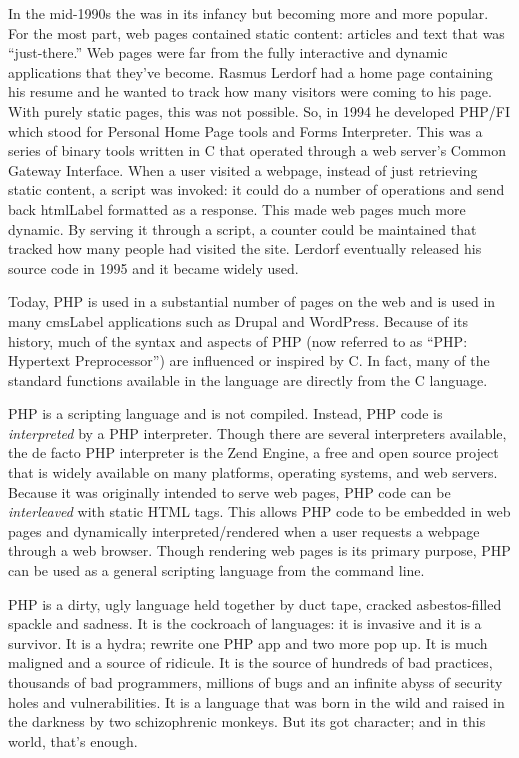 

In the mid-1990s the 
was in its infancy but
becoming more and more popular.  For the most part, web pages
contained static content: articles and text that was ``just-there.''
Web pages were far from the fully interactive and dynamic 
applications that they've become.  Rasmus Lerdorf had a home
page containing his resume and he wanted to track how many
visitors were coming to his page.  With purely static pages, this
was not possible.  So, in 1994 he developed PHP/FI which stood
for Personal Home Page tools and Forms Interpreter.  This was 
a series of binary tools written in C that operated through a 
web server's Common Gateway Interface.  When a user visited
a webpage, instead of just retrieving static content, a script
was invoked: it could do a number of operations and 
send back \gls{htmlLabel} formatted as a response.  This made
web pages much more dynamic.  By serving it through a script,
a counter could be maintained that tracked how many people
had visited the site.  Lerdorf eventually released his source
code in 1995 and it became widely used.

Today, PHP is used in a substantial number of pages on the web and
is used in many \gls{cmsLabel} applications such as Drupal and 
WordPress.  Because of its history, much of the syntax and aspects of 
PHP (now referred to as ``PHP: Hypertext Preprocessor'') are 
influenced or inspired by C.  In fact, many of the standard
functions available in the language are directly from the C
language.

PHP is a scripting language and is not compiled.  Instead, PHP
code is \emph{interpreted} by a PHP interpreter.  Though there
are several interpreters available, the de facto PHP 
interpreter is the Zend Engine, a free and open source
project that is widely available on many platforms, operating
systems, and web servers.  Because it was originally intended 
to serve web pages, PHP 
code can be \emph{interleaved} with static HTML tags.  This
allows PHP code to be embedded in web pages and dynamically
interpreted/rendered when a user requests a webpage through
a web browser.  Though rendering web pages is its primary 
purpose, PHP can be used as a general scripting language 
from the command line.

PHP is a dirty, ugly language held together by duct tape, cracked
asbestos-filled spackle and sadness.  It is the cockroach of languages: it 
is invasive and it is a survivor.  It is a hydra; rewrite one PHP app
and two more pop up.  It is much maligned and a source of ridicule.
It is the source of hundreds of bad practices, thousands of bad 
programmers, millions of bugs and an infinite abyss of security 
holes and vulnerabilities.  It is a language that was born in the
wild and raised in the darkness by two schizophrenic monkeys.
But its got character; and in this world, that's enough.

